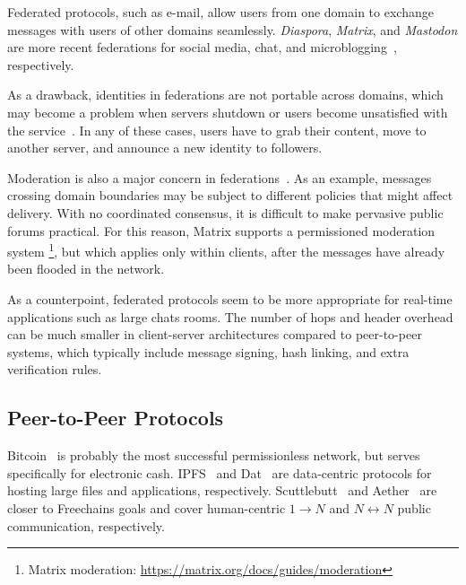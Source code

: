 \documentclass[12pt]{article}
\newcommand{\FC}       {Freechains\xspace}
\newcommand{\Xon} {$1{\rightarrow}N$\xspace}
\newcommand{\Xnn} {$N{\leftrightarrow}N$\xspace}
\begin{document}
Federated protocols, such as e-mail, allow users from one domain to exchange
messages with users of other domains seamlessly.
\emph{Diaspora}, \emph{Matrix}, and \emph{Mastodon} are more recent
federations for social media, chat, and microblogging~\cite{p2p.ecosystem},
respectively.

As a drawback, identities in federations are not portable across domains, which
may become a problem when servers shutdown or users become unsatisfied with the
service~\cite{fed.distributed}.
In any of these cases, users have to grab their content, move to another
server, and announce a new identity to followers.

Moderation is also a major concern in federations~\cite{p2p.ecosystem}.
As an example, messages crossing domain boundaries may be subject to different
policies that might affect delivery.
With no coordinated consensus, it is difficult to make pervasive public forums
practical.
%
For this reason, Matrix supports a permissioned moderation system%
\footnote{Matrix moderation: \url{https://matrix.org/docs/guides/moderation}},
but which applies only within clients, after the messages have already been
flooded in the network.

As a counterpoint, federated protocols seem to be more appropriate for
real-time applications such as large chats rooms.
The number of hops and header overhead can be much smaller in client-server
architectures compared to peer-to-peer systems, which typically include message
signing, hash linking, and extra verification rules.

\subsection{Peer-to-Peer Protocols}

Bitcoin~\cite{p2p.bitcoin} is probably the most successful permissionless
network, but serves specifically for electronic cash.
IPFS~\cite{p2p.ipfs} and Dat~\cite{p2p.dat} are data-centric protocols for
hosting large files and applications, respectively.
Scuttlebutt~\cite{p2p.scuttlebutt} and Aether~\cite{p2p.ecosystem} are closer
to \FC goals and cover human-centric \Xon and \Xnn public communication,
respectively.
\end{document}
